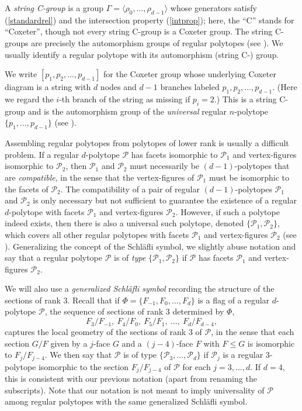 \documentclass[12pt]{amsart}
\theoremstyle{definition}
\begin{document}
A \textit{string C-group\/} is a group $\Gamma = \langle \rho_0,\ldots, \rho_{d-1} \rangle$ whose generators satisfy (\ref{standardrel}) and the intersection property (\ref{intprop}); here, the ``C'' stands for ``Coxeter'', though not every string C-group is a Coxeter group. The string C-groups are precisely the automorphism groups of regular polytopes (see \cite[Ch. 2E]{McMSch2002}). We usually identify a regular polytope with its automorphism (string C-) group.

We write $[p_{1},p_{2},\ldots,p_{d-1}]$ for the Coxeter group whose underlying Coxeter diagram is a string with $d$ nodes and $d-1$ branches labeled $p_{1},p_{2},\ldots,p_{d-1}$. (Here we regard the $i$-th branch of the string as missing if $p_{i}=2$.) This is a string C-group and is the automorphism group of the \textit{universal} regular $n$-polytope $\{p_{1},\ldots,p_{d-1}\}$ (see \cite[Ch. 3D]{McMSch2002}). 

Assembling regular polytopes from polytopes of lower rank is usually a difficult problem. If a regular $d$-polytope $\mathcal{P}$ has facets isomorphic to $\mathcal{P}_1$ and vertex-figures isomorphic to $\mathcal{P}_2$, then $\mathcal{P}_1$ and $\mathcal{P}_2$ must necessarily be $(d-1)$-polytopes that are \textit{compatible}, in the sense that the vertex-figures of $\mathcal{P}_1$ must be isomorphic to the facets of $\mathcal{P}_2$. The compatibility of a pair of regular $(d-1)$-polytopes $\mathcal{P}_1$ and $\mathcal{P}_2$ is only necessary but not sufficient to guarantee the existence of a regular $d$-polytope with facets $\mathcal{P}_1$ and vertex-figures $\mathcal{P}_2$. However, if such a polytope indeed exists, then there is also a universal such polytope, denoted $\{\mathcal{P}_1,\mathcal{P}_2\}$, which covers all other regular polytopes with facets $\mathcal{P}_1$ and vertex-figures $\mathcal{P}_2$ (see \cite[Thm.\,4A2]{McMSch2002}). Generalizing the concept of the Schl\"afli symbol, we slightly abuse notation and say that a regular polytope $\mathcal{P}$ is of \textit{type\/} $\{\mathcal{P}_1,\mathcal{P}_2\}$ if $\mathcal{P}$ has facets $\mathcal{P}_1$ and vertex-figures $\mathcal{P}_2$.

We will also use a \textit{generalized Schl\"afli symbol\/} recording the structure of the sections of rank 3. Recall that if $\Phi=\{F_{-1},F_0,\ldots,F_d\}$ is a flag of a regular $d$-polytope $\mathcal P$, the sequence of sections of rank 3 determined by $\Phi$, 
\begin{equation}
\label{rk3sections}
F_3/F_{-1},\ F_4/F_0,\ F_5/F_1,\ \ldots,\ F_{d}/F_{d-4},
\end{equation}
captures the local geometry of the sections of rank 3 of $\mathcal P$, in the sense that each section $G/F$ given by a $j$-face $G$ and a $(j-4)$-face $F$ with $F\leq G$ is isomorphic to $F_j/F_{j-4}$. We then say that $\mathcal{P}$ is of type $\{\mathcal{P}_3,\ldots,\mathcal{P}_{d}\}$ if $\mathcal{P}_j$ is a regular 3-polytope isomorphic to the section $F_{j}/F_{j-4}$ of $\mathcal{P}$ for each $j=3,\ldots,d$. If $d=4$, this is consistent with our previous notation (apart from renaming the subscripts). Note that our notation is not meant to imply universality of $\mathcal{P}$ among regular polytopes with the same generalized Schl\"afli symbol.
\end{document}
